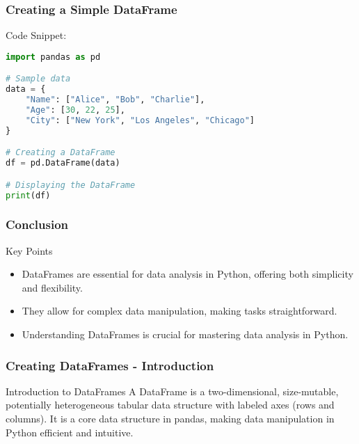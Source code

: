 \documentclass[aspectratio=169]{beamer}
\begin{document}
\begin{frame}[fragile]
    \frametitle{Creating a Simple DataFrame}
    \begin{block}{Code Snippet:}
    \begin{lstlisting}[language=Python]
import pandas as pd

# Sample data
data = {
    "Name": ["Alice", "Bob", "Charlie"],
    "Age": [30, 22, 25],
    "City": ["New York", "Los Angeles", "Chicago"]
}

# Creating a DataFrame
df = pd.DataFrame(data)

# Displaying the DataFrame
print(df)
    \end{lstlisting}
    \end{block}
\end{frame}

\begin{frame}[fragile]
    \frametitle{Conclusion}
    \begin{block}{Key Points}
        \begin{itemize}
            \item DataFrames are essential for data analysis in Python, offering both simplicity and flexibility.
            \item They allow for complex data manipulation, making tasks straightforward.
            \item Understanding DataFrames is crucial for mastering data analysis in Python.
        \end{itemize}
    \end{block}
\end{frame}

\begin{frame}[fragile]
    \frametitle{Creating DataFrames - Introduction}
    \begin{block}{Introduction to DataFrames}
        A DataFrame is a two-dimensional, size-mutable, potentially heterogeneous tabular data structure with labeled axes (rows and columns). 
        It is a core data structure in pandas, making data manipulation in Python efficient and intuitive.
    \end{block}
\end{frame}
\end{document}

